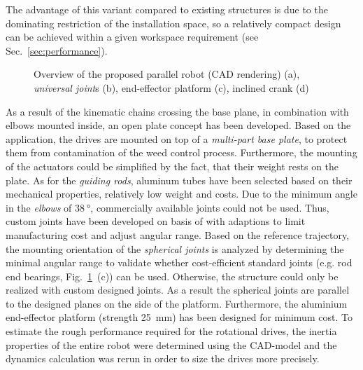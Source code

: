 \documentclass[runningheads]{llncs}
\begin{document}
The advantage of this variant compared to existing structures is due to the dominating restriction of the installation space, so a relatively compact design can be achieved within a given workspace requirement (see Sec.~\ref{sec:performance}). 
%
%
%
%
%
%
%
%
%
%
%
\begin{figure}[tb]
	\centering
	\def\svgwidth{1\columnwidth}
	
	\caption{Overview of the proposed parallel robot (CAD rendering) (a), \emph{universal joint}s (b), end-effector platform (c), inclined crank (d)}
	\label{fig:design}
\end{figure}
As a result of the kinematic chains crossing the base plane, in combination with elbows mounted inside, an open plate concept has been developed.
Based on the application, the drives are mounted on top of a \emph{multi-part base plate}, to protect them from contamination of the weed control process.
Furthermore, the mounting of the actuators could be simplified by the fact, that their weight rests on the plate.
As for the \emph{guiding rods}, aluminum tubes have been selected based on their mechanical properties, relatively low weight and costs.
Due to the minimum angle in the \emph{elbows} of $\SI{38}{\degree}$, commercially available joints could not be used. 
Thus, custom joints have been developed on basis of \cite{Otremba.2005} with adaptions to limit manufacturing cost and adjust angular range.
Based on the reference trajectory, the mounting orientation of the \emph{spherical joints} is analyzed by determining the minimal angular range to validate whether cost-efficient standard joints (e.g. rod end bearings, Fig.~\ref{fig:design}~(c)) can be used.
Otherwise, the structure could only be realized with custom designed joints.
As a result the spherical joints are parallel to the designed planes on the side of the platform.
Furthermore, the aluminium end-effector platform (strength \SI{25}{\milli\metre}) has been designed for minimum cost. 
To estimate the rough performance required for the rotational drives, the inertia properties of the entire robot were determined using the CAD-model and the dynamics calculation was rerun in order to size the drives more precisely. 
\end{document}
